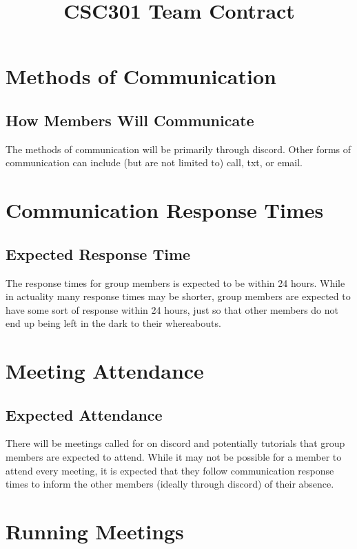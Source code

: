 \documentclass[hidelinks, 12pt]{article}    %
\title{CSC301 Team Contract}
\begin{document}
    \maketitle
    \pagebreak
    \tableofcontents
    \pagebreak

    \section{Methods of Communication}
        \subsection{How Members Will Communicate}
            The methods of communication will be primarily through discord. Other forms of communication can include
            (but are not limited to) call, txt, or email.

    \section{Communication Response Times}
        \subsection{Expected Response Time}
            The response times for group members is expected to be within 24 hours. While in actuality many response
            times may be shorter, group members are expected to have some sort of response within 24 hours, just so
            that other members do not end up being left in the dark to their whereabouts.

    \section{Meeting Attendance}
        \subsection{Expected Attendance}
            There will be meetings called for on discord and potentially tutorials that group members are
            expected to attend. While it may not be possible for a member to attend every meeting,
            it is expected that they follow communication response times to inform the other members
            (ideally through discord) of their absence.

    \section{Running Meetings}
\end{document}
